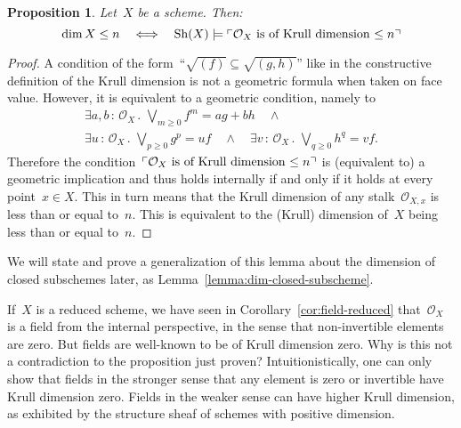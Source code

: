 \documentclass[10pt]{amsart}
\theoremstyle{definition}
\theoremstyle{plain}
\newtheorem{prop}[defn]{Proposition}
\theoremstyle{remark}
\renewcommand{\O}{\mathcal{O}}
\newcommand{\Sh}{\mathrm{Sh}}
\newcommand{\?}{\,{:}\,}
\renewcommand{\_}{\mathpunct{.}\,}
\newcommand{\speak}[1]{\ulcorner\text{\textnormal{#1}}\urcorner}
\newcommand{\defeq}{\vcentcolon=}
\begin{document}
\begin{prop}\label{prop:dimension-scheme-ox}
Let~$X$ be a scheme. Then:
\[ \dim X \leq n \quad\Longleftrightarrow\quad
  \Sh(X) \models \speak{$\O_X$ is of Krull dimension~$\leq n$}
  \]
\end{prop}
\begin{proof}

A condition of the form~``$\sqrt{(f)} \subseteq \sqrt{(g,h)}$''
like in the constructive definition of the Krull dimension is not a geometric
formula when taken on face value. However, it is equivalent to a geometric
condition, namely to
\begin{multline*}
  \exists a,b\?\O_X\_ \bigvee_{m \geq 0} f^m = ag + bh \quad\wedge\quad \\
  \exists u\?\O_X\_ \bigvee_{p \geq 0} g^p = uf \quad\wedge\quad
  \exists v\?\O_X\_ \bigvee_{q \geq 0} h^q = vf.\end{multline*}
Therefore the condition~$\speak{$\O_X$ is of Krull
dimension~$\leq n$}$ is (equivalent to) a geometric implication and thus holds
internally if and only if it holds at every point~$x \in X$. This in turn means that the
Krull dimension of any stalk~$\O_{X,x}$ is less than or equal to~$n$. This is
equivalent to the (Krull) dimension of~$X$ being less than or equal to~$n$.
\end{proof}

We will state and prove a generalization of this lemma about the dimension of closed
subschemes later, as Lemma~\ref{lemma:dim-closed-subscheme}.

If~$X$ is a reduced scheme, we have seen in Corollary~\ref{cor:field-reduced}
that~$\O_X$ is a field from the internal perspective, in the sense that
non-invertible elements are zero. But fields are well-known to be of Krull
dimension zero. Why is this not a contradiction to the proposition just proven?
Intuitionistically, one can only show that fields in the stronger sense that
any element is zero or invertible have Krull dimension zero. Fields in the
weaker sense can have higher Krull dimension, as exhibited by the structure
sheaf of schemes with positive dimension.
\end{document}
